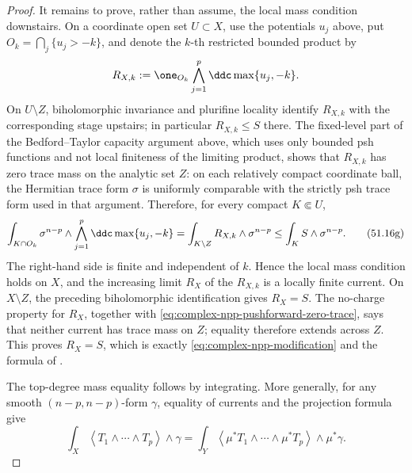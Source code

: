 \begin{proof}
It remains to prove, rather than assume, the local mass condition downstairs.
On a coordinate open set \(U\subset X\), use the potentials \(u_j\) above,
put \(O_k=\bigcap_j\{u_j>-k\}\), and denote the \(k\)-th restricted bounded
product by
\[
 R_{X,k}:=\one_{O_k}\bigwedge_{j=1}^p
                         \ddc\max\{u_j,-k\}.
\]
On \(U\setminus Z\), biholomorphic invariance and plurifine locality identify
\(R_{X,k}\) with the corresponding stage upstairs; in particular
\(R_{X,k}\leq S\) there.  The fixed-level part of the Bedford--Taylor capacity
argument above, which uses only bounded psh functions and not local finiteness
of the limiting product, shows that \(R_{X,k}\) has zero trace mass on the
analytic set \(Z\): on each relatively compact coordinate ball, the Hermitian
trace form \(\sigma\) is uniformly comparable with the strictly psh trace
form used in that argument.  Therefore, for every compact \(K\Subset U\),
\[
 \int_{K\cap O_k}\sigma^{n-p}\wedge
       \bigwedge_{j=1}^p\ddc\max\{u_j,-k\}
 =\int_{K\setminus Z}R_{X,k}\wedge\sigma^{n-p}
 \leq\int_K S\wedge\sigma^{n-p}.
\tag{51.16g}\label{eq:complex-npp-modification-local-mass}
\]
The right-hand side is finite and independent of \(k\).  Hence the local
mass condition holds on \(X\), and the increasing limit \(R_X\) of the
\(R_{X,k}\) is a locally finite current.  On \(X\setminus Z\), the preceding
biholomorphic identification gives \(R_X=S\).  The no-charge property for
\(R_X\), together with \eqref{eq:complex-npp-pushforward-zero-trace}, says
that neither current has trace mass on \(Z\); equality therefore extends
across \(Z\).  This proves
\(R_X=S\), which is exactly \eqref{eq:complex-npp-modification} and the
formula of \cite[Remark~1.7]{BEGZ10}.

The top-degree mass equality follows by integrating.  More generally, for
any smooth \((n-p,n-p)\)-form \(\gamma\), equality of currents and the
projection formula give
\[
 \int_X\left\langle T_1\wedge\cdots\wedge T_p\right\rangle\wedge\gamma
 =\int_Y\left\langle\mu^*T_1\wedge\cdots\wedge\mu^*T_p\right\rangle
              \wedge\mu^*\gamma .
\]
\end{proof}
